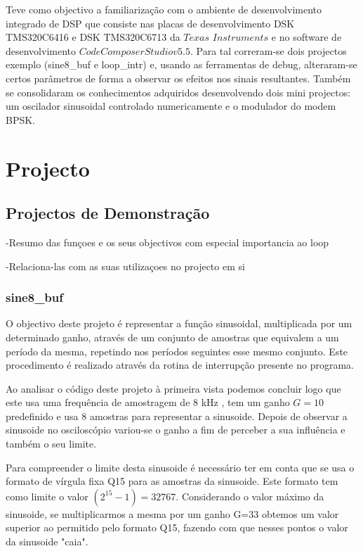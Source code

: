 \documentclass[11pt]{article}
\begin{document}
Teve como objectivo a familiarização com o ambiente de desenvolvimento integrado de DSP que consiste nas placas de desenvolvimento DSK TMS320C6416 e DSK TMS320C6713 da $Texas$ $Instruments$ e no software de desenvolvimento $Code Composer Studio v5.5$. Para tal correram-se dois projectos exemplo (sine8\_buf e loop\_intr) e, usando as ferramentas de debug, alteraram-se certos parâmetros de forma a observar os efeitos nos sinais resultantes. Também se consolidaram os conhecimentos adquiridos desenvolvendo dois mini projectos: um oscilador sinusoidal controlado numericamente e o modulador do modem BPSK.

%
%

\section{Projecto}

\subsection{Projectos de Demonstração}
-Resumo das funçoes e os seus objectivos com especial importancia ao loop

-Relaciona-las com as suas utilizaçoes no projecto em si

\subsubsection{sine8\_buf}
O objectivo deste projeto é representar a função sinusoidal, multiplicada por um determinado ganho, através de um conjunto de amostras que equivalem a um período da mesma, repetindo nos períodos seguintes esse mesmo conjunto. Este procedimento é realizado através da rotina de interrupção presente no programa. 

Ao analisar o código deste projeto à primeira vista podemos concluir logo que este usa uma frequência de amostragem de 8 kHz , tem um ganho $G=10$ predefinido e usa 8 amostras para representar a sinusoide. Depois de observar a sinusoide no osciloscópio variou-se o ganho a fim de perceber a sua influência e também o seu limite.
 
Para compreender o limite desta sinusoide é necessário ter em conta que se usa o formato de vírgula fixa Q15 para as amostras da sinusoide. Este formato tem como limite o valor $(2^{15}-1) = 32767$. Considerando o valor máximo da sinusoide, se multiplicarmos a mesma por um ganho G=33 obtemos um valor superior ao permitido pelo formato Q15, fazendo com que nesses pontos o valor da sinusoide "caia".     
\end{document}
